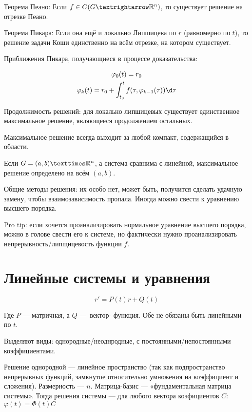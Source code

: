 \documentclass[12pt, a4paper]{article}
\begin{document}
Теорема Пеано: Если $f \in C(G → \sR^n)$, то существует решение на отрезке Пеано.

Теорема Пикара: Если она ещё и локально Липшицева по $r$ (равномерно по $t$), 
то решение задачи Коши единственно на всём отрезке, на котором существует.

Приближения Пикара, получающиеся в процессе доказательства: 

\begin{gather}
    \varphi_0(t) = r_0 \\
    \varphi_k(t) = r_0 + \int_{t_0}^{t} f(\tau, \varphi_{k - 1}(\tau)) \d \tau
\end{gather}

Продолжимость решений: для локально липшицевых существует единственное максимальное решение, являющееся продолжением остальных.

Максимальное решение всегда выходит за любой компакт, содержащийся в области.

Если $G = (a, b) × \sR^n$, а система сравнима с линейной, максимальное решение определено на всём $(a, b)$.

Общие методы решения: их особо нет, может быть, получится сделать удачную замену, чтобы взаимозависимость пропала.
Иногда можно свести к уравнению высшего порядка.

Pro tip: если хочется проанализировать нормальное уравнение высшего порядка, можно в голове свести его к системе, 
но фактически нужно проанализировать непрерывность/липщицевость функции $f$.

\section{Линейные системы и уравнения}

\begin{equation}
    r' = P(t)r + Q(t)
\end{equation}

Где $P$ — матричная, а $Q$ — вектор- функция. Обе не обязаны быть линейными по $t$.

Выделяют виды: однородные/неоднродные, с постоянными/непостоянными коэффициентами.

Решение однородной — линейное пространство (так как подпространство непрерывных функций, замкнутое относительно умножения на коэффициент и сложения).
Размерность — $n$. Матрица-базис — «фундаментальная матрица системы».
Тогда решения системы — для любого вектора коэфициентов $C$: $\varphi(t) = \Phi(t) C$
\end{document}
